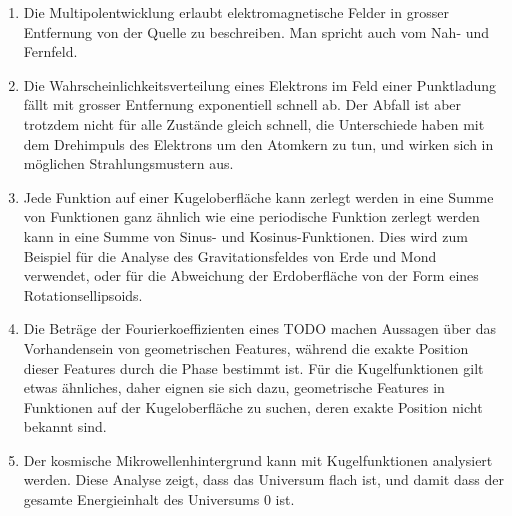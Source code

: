 \begin{enumerate}
\item
Die Multipolentwicklung erlaubt elektromagnetische Felder in grosser
Entfernung von der Quelle zu beschreiben.
Man spricht auch vom Nah- und Fernfeld.
\item
Die Wahrscheinlichkeitsverteilung eines Elektrons im Feld einer Punktladung
fällt mit grosser Entfernung exponentiell schnell ab.
Der Abfall ist aber trotzdem nicht für alle Zustände gleich schnell,
die Unterschiede haben mit dem Drehimpuls des Elektrons um den Atomkern
zu tun, und wirken sich in möglichen Strahlungsmustern aus.
\item
Jede Funktion auf einer Kugeloberfläche kann zerlegt werden in eine
Summe von Funktionen ganz ähnlich wie eine periodische Funktion
zerlegt werden kann in eine Summe von Sinus- und Kosinus-Funktionen.
Dies wird zum Beispiel für die Analyse des Gravitationsfeldes von
Erde und Mond verwendet, oder für die Abweichung der Erdoberfläche
von der Form eines Rotationsellipsoids.
\item 
Die Beträge der Fourierkoeffizienten eines TODO machen Aussagen
über das Vorhandensein von geometrischen Features, während die exakte
Position dieser Features durch die Phase bestimmt ist.
Für die Kugelfunktionen gilt etwas ähnliches, daher eignen sie
sich dazu, geometrische Features in Funktionen auf der Kugeloberfläche
zu suchen, deren exakte Position nicht bekannt sind.
\item
Der kosmische Mikrowellenhintergrund kann mit Kugelfunktionen analysiert
werden.
Diese Analyse zeigt, dass das Universum flach ist, und damit dass der
gesamte Energieinhalt des Universums $0$ ist.
\end{enumerate}








